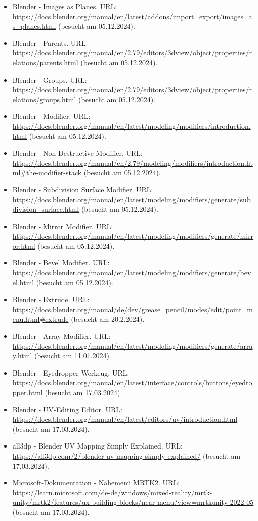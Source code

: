 \begin{itemize}
    \item Blender - Images as Planes. URL: \url{https://docs.blender.org/manual/en/latest/addons/import_export/images_as_planes.html} (besucht am 05.12.2024).
    \item Blender - Parents. URL: \url{https://docs.blender.org/manual/en/2.79/editors/3dview/object/properties/relations/parents.html} (besucht am 05.12.2024).
    \item Blender - Groups. URL: \url{https://docs.blender.org/manual/en/2.79/editors/3dview/object/properties/relations/groups.html} (besucht am 05.12.2024).
    \item Blender - Modifier. URL: \url{https://docs.blender.org/manual/en/latest/modeling/modifiers/introduction.html} (besucht am 05.12.2024).
    \item Blender - Non-Destructive Modifier. URL: \url{https://docs.blender.org/manual/en/2.79/modeling/modifiers/introduction.html#the-modifier-stack} (besucht am 05.12.2024).
    \item Blender - Subdivision Surface Modifier. URL: \url{https://docs.blender.org/manual/en/latest/modeling/modifiers/generate/subdivision_surface.html} (besucht am 05.12.2024).
    \item Blender - Mirror Modifier. URL: \url{https://docs.blender.org/manual/en/latest/modeling/modifiers/generate/mirror.html} (besucht am 05.12.2024).
    \item Blender - Bevel Modifier. URL: \url{https://docs.blender.org/manual/en/latest/modeling/modifiers/generate/bevel.html} (besucht am 05.12.2024).
    \item Blender - Extrude. URL: \url{https://docs.blender.org/manual/de/dev/grease_pencil/modes/edit/point_menu.html#extrude} (besucht am 20.2.2024).
    \item Blender - Array Modifier. URL: \url{https://docs.blender.org/manual/en/latest/modeling/modifiers/generate/array.html} (besucht am 11.01.2024)
    \item Blender - Eyedropper Werkeug. URL: \url{https://docs.blender.org/manual/en/latest/interface/controls/buttons/eyedropper.html} (besucht am 17.03.2024).
    \item Blender - UV-Editing Editor. URL: \url{https://docs.blender.org/manual/en/latest/editors/uv/introduction.html} (besucht am 17.03.2024).
    \item all3dp - Blender UV Mapping Simply Explained. URL: \url{https://all3dp.com/2/blender-uv-mapping-simply-explained/} (besucht am 17.03.2024).
    \item Microsoft-Dokumentation - Nähemenü MRTK2. URL: \url{https://learn.microsoft.com/de-de/windows/mixed-reality/mrtk-unity/mrtk2/features/ux-building-blocks/near-menu?view=mrtkunity-2022-05} (besucht am 17.03.2024).

\end{itemize}
